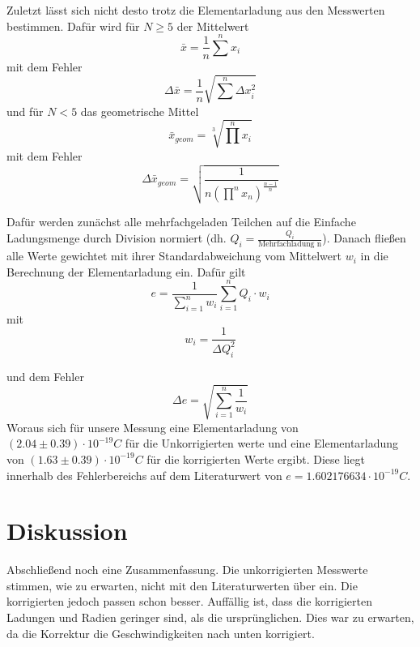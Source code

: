 \documentclass{scrartcl}
\begin{document}
            Zuletzt lässt sich nicht desto trotz die Elementarladung aus den Messwerten bestimmen. Dafür wird für $N \geq 5$
            der Mittelwert 
            \begin{equation}
                \bar{x} = \frac{1}{n} \sum^n x_i
            \end{equation} 
            mit dem Fehler
            \begin{equation}
                \Delta \bar{x} = \frac{1}{n} \sqrt{\sum^n \Delta x_i^2} 
            \end{equation}
            und für $N < 5$ das geometrische Mittel
            \begin{equation}
                \bar{x}_{geom} = \sqrt[3]{\prod^n x_i}
            \end{equation}
            mit dem Fehler
            \begin{equation}
                \Delta \bar{x}_{geom} = \sqrt{\frac{1}{n (\prod^n x_n)^{\frac{n-1}{n}}}}
            \end{equation}
            
            Dafür werden zunächst
            alle mehrfachgeladen Teilchen auf die Einfache Ladungsmenge durch Division normiert (dh. $Q_i = \frac{Q_i}{\text{Mehrfachladung n}}$).
            Danach fließen alle Werte gewichtet mit ihrer Standardabweichung vom Mittelwert $w_i$ in die Berechnung der
            Elementarladung ein. Dafür gilt
            \begin{equation}
                e = \frac{1}{\sum_{i=1}^n w_i} \sum_{i=1}^n Q_i \cdot w_i 
            \end{equation}
            mit 
            \begin{equation}
                w_i = \frac{1}{\Delta Q_i^2}
            \end{equation}

            und dem Fehler
            \begin{equation}
                \Delta e = \sqrt{\sum_{i=1}^n\frac{1}{w_i}}
            \end{equation}
            Woraus sich für unsere Messung eine Elementarladung von $(2.04\pm 0.39)\cdot 10^{-19} C$ für die Unkorrigierten werte und eine
            Elementarladung von $(1.63\pm 0.39)\cdot 10^{-19}C$ für die korrigierten Werte ergibt.
            Diese liegt innerhalb des Fehlerbereichs auf dem Literaturwert von $e=1.602176634\cdot 10^{-19}C$.
            \section{Diskussion}
                Abschließend noch eine Zusammenfassung. Die unkorrigierten Messwerte stimmen, wie zu erwarten, 
                nicht mit den Literaturwerten über ein. Die korrigierten jedoch passen schon besser. 
                Auffällig ist, dass die korrigierten Ladungen und Radien geringer sind, als die ursprünglichen. 
                Dies war zu erwarten, da die Korrektur die Geschwindigkeiten nach unten korrigiert. 
            
\end{document}
